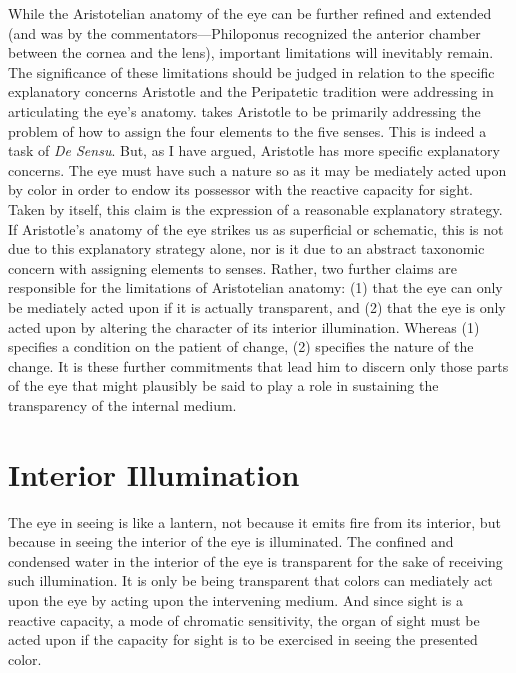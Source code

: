 While the Aristotelian anatomy of the eye can be further refined and extended (and was by the commentators---Philoponus recognized the anterior chamber between the cor\-nea and the lens), important limitations will inevitably remain. The significance of these limitations should be judged in relation to the specific explanatory concerns Aristotle and the Peripatetic tradition were addressing in articulating the eye's anatomy. \citet{Lloyd:1978fk} takes Aristotle to be primarily addressing the problem of how to assign the four elements to the five senses. This is indeed a task of \emph{De Sensu}. But, as I have argued, Aristotle has more specific explanatory concerns. The eye must have such a nature so as it may be mediately acted upon by color in order to endow its possessor with the reactive capacity for sight. Taken by itself, this claim is the expression of a reasonable explanatory strategy. If Aristotle's anatomy of the eye strikes us as superficial or schematic, this is not due to this explanatory strategy alone, nor is it due to an abstract taxonomic concern with assigning elements to senses. Rather, two further claims are responsible for the limitations of Aristotelian anatomy: (1) that the eye can only be mediately acted upon if it is actually transparent, and (2) that the eye is only acted upon by altering the character of its interior illumination. Whereas (1) specifies a condition on the patient of change, (2) specifies the nature of the change. It is these further commitments that lead him to discern only those parts of the eye that might plausibly be said to play a role in sustaining the transparency of the internal medium.



\section{Interior Illumination} %
\label{sec:interior_illumination}

The eye in seeing is like a lantern, not because it emits fire from its interior, but because in seeing the interior of the eye is illuminated. The confined and condensed water in the interior of the eye is transparent for the sake of receiving such illumination. It is only be being transparent that colors can mediately act upon the eye by acting upon the intervening medium. And since sight is a reactive capacity, a mode of chromatic sensitivity, the organ of sight must be acted upon if the capacity for sight is to be exercised in seeing the presented color.

